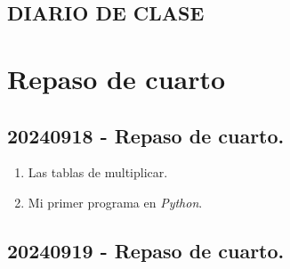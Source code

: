 \documentclass[a4paper,12pt]{article}
\begin{document}
\begin{center}
    \section*{DIARIO DE CLASE}
\end{center}

\tableofcontents

\newpage

\sloppy %

\section*{Repaso de cuarto}

\subsection{20240918 - Repaso de cuarto.}

\begin{enumerate}
    \item Las tablas de multiplicar.
    \item Mi primer programa en \textit{Python}.
\end{enumerate}

\subsection{20240919 - Repaso de cuarto.}
\end{document}
